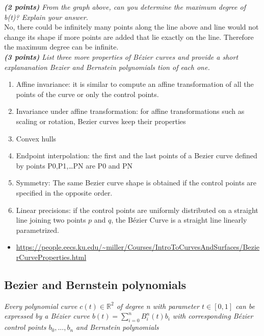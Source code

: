 \documentclass[a4paper,10pt]{article}
\begin{document}
\textit{\textbf{(2 points)} From the graph above, can you determine the maximum degree of b(t)? Explain your answer.}\\

No, there could be infinitely many points along the line above and line would not change its shape if more points are added that lie exactly on the line. Therefore the maximum degree can be infinite.\\

\textit{\textbf{(3 points)} List three more properties of Bézier curves and provide a short explananation Bezier and Bernstein polynomials
tion of each one.}\\

\begin{enumerate}
	\item Affine invariance: it is similar to compute an affine transformation of all the points of the curve or only the control points.
	\item Invariance under affine transformation: for affine transformations such as scaling or rotation, Bezier curves keep their properties
	\item Convex hulls
	\item Endpoint interpolation: the first and the last points of a Bezier curve defined by points P0,P1,…PN are P0 and PN
	\item Symmetry: The same Bezier curve shape is obtained if the control points are specified in the opposite order.
	\item Linear precisions: if the control points are uniformly distributed on a straight line joining two points $p$ and $q$, the Bézier Curve is a straight line linearly parametrized.
\end{enumerate}
\begin{itemize}
	\item \url{https://people.eecs.ku.edu/~miller/Courses/IntroToCurvesAndSurfaces/BezierCurveProperties.html}
\end{itemize}

\subsection{Bezier and Bernstein polynomials}
\textit{Every polynomial curve $c(t)\in  \mathbb{R}^2$ of degree n with parameter $t \in [0, 1]$ can be expressed by a Bézier curve $b(t) = \sum_{i=0}^n B_i^n(t)b_i$ with corresponding Bézier control points $b_0,...,b_n$ and Bernstein polynomials}\\
\end{document}
